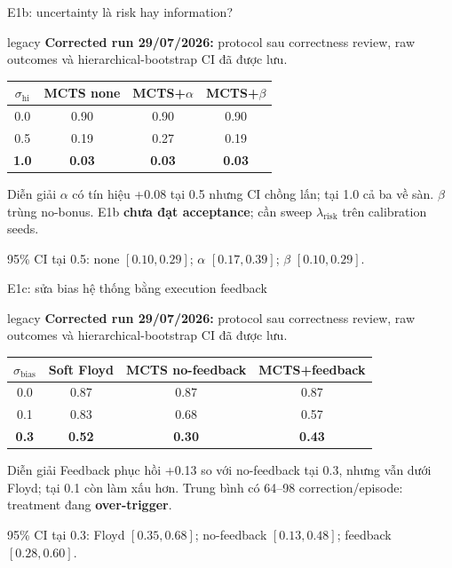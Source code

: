 \documentclass[aspectratio=169,10pt]{beamer}
\newcommand{\resultbanner}{%
  \begin{beamercolorbox}[rounded=true,sep=0.6ex,wd=\textwidth]{legacy}
    \color{LegacyFg}\scriptsize
    \textbf{Corrected run 29/07/2026:} protocol sau correctness review,
    raw outcomes và hierarchical-bootstrap CI đã được lưu.
  \end{beamercolorbox}\vspace{0.5em}
}
\begin{document}
\begin{frame}{E1b: uncertainty là risk hay information?}
  \resultbanner
  \small
  \begin{tabular}{@{}cccc@{}}
    \toprule
    $\sigma_{\mathrm{hi}}$ & MCTS none & MCTS+$\alpha$ & MCTS+$\beta$ \\
    \midrule
    0.0 & 0.90 & 0.90 & 0.90 \\
    0.5 & 0.19 & 0.27 & 0.19 \\
    \textbf{1.0} & \textbf{0.03} & \textbf{0.03} & \textbf{0.03} \\
    \bottomrule
  \end{tabular}

  \vspace{0.8em}
  \begin{block}{Diễn giải}
    $\alpha$ có tín hiệu +0.08 tại 0.5 nhưng CI chồng lấn; tại 1.0 cả ba về sàn.
    $\beta$ trùng no-bonus. E1b \textbf{chưa đạt acceptance}; cần sweep
    $\lambda_{\mathrm{risk}}$ trên calibration seeds.
  \end{block}
  \scriptsize 95\% CI tại 0.5: none $[0.10,0.29]$;
  $\alpha$ $[0.17,0.39]$; $\beta$ $[0.10,0.29]$.
\end{frame}

\begin{frame}{E1c: sửa bias hệ thống bằng execution feedback}
  \resultbanner
  \small
  \begin{tabular}{@{}cccc@{}}
    \toprule
    $\sigma_{\mathrm{bias}}$ & Soft Floyd & MCTS no-feedback & MCTS+feedback \\
    \midrule
    0.0 & 0.87 & 0.87 & 0.87 \\
    0.1 & 0.83 & 0.68 & 0.57 \\
    \textbf{0.3} & \textbf{0.52} & \textbf{0.30} & \textbf{0.43} \\
    \bottomrule
  \end{tabular}

  \vspace{0.8em}
  \begin{block}{Diễn giải}
    Feedback phục hồi +0.13 so với no-feedback tại 0.3, nhưng vẫn dưới Floyd;
    tại 0.1 còn làm xấu hơn. Trung bình có 64--98 correction/episode:
    treatment đang \textbf{over-trigger}.
  \end{block}
  \scriptsize 95\% CI tại 0.3: Floyd $[0.35,0.68]$;
  no-feedback $[0.13,0.48]$; feedback $[0.28,0.60]$.
\end{frame}
\end{document}
